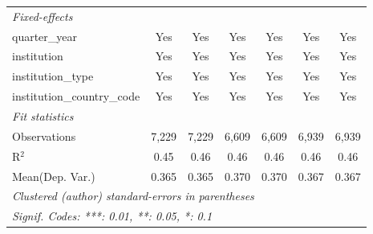 \begin{tabular}{lcccccc}
   \midrule
   \emph{Fixed-effects}\\
   quarter\_year                      & Yes     & Yes            & Yes     & Yes     & Yes     & Yes\\  
   institution                        & Yes     & Yes            & Yes     & Yes     & Yes     & Yes\\  
   institution\_type                  & Yes     & Yes            & Yes     & Yes     & Yes     & Yes\\  
   institution\_country\_code         & Yes     & Yes            & Yes     & Yes     & Yes     & Yes\\  
   \midrule
   \emph{Fit statistics}\\
   Observations                       & 7,229   & 7,229          & 6,609   & 6,609   & 6,939   & 6,939\\  
   R$^2$                              & 0.45    & 0.46           & 0.46    & 0.46    & 0.46    & 0.46\\  
Mean(Dep. Var.) & 0.365 & 0.365 & 0.370 & 0.370 & 0.367 & 0.367 \\
   \midrule \midrule
   \multicolumn{7}{l}{\emph{Clustered (author) standard-errors in parentheses}}\\
   \multicolumn{7}{l}{\emph{Signif. Codes: ***: 0.01, **: 0.05, *: 0.1}}\\
\end{tabular}
\par\endgroup
